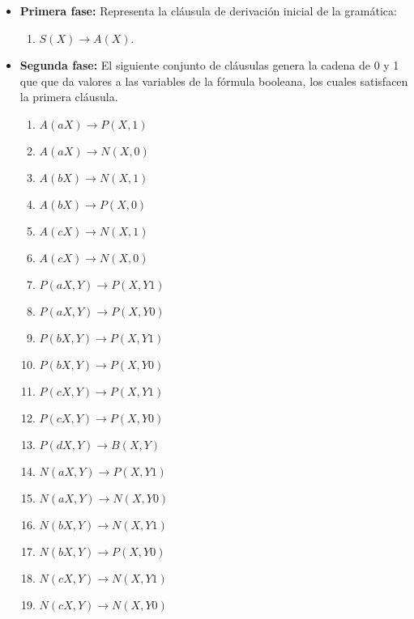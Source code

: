\begin{itemize}
    \item \textbf{Primera fase:} Representa la cláusula de derivación inicial de la gramática:
          \begin{enumerate}
              \item $S(X)\to A(X)$.
          \end{enumerate}

    \item \textbf{Segunda fase:} El siguiente conjunto de cláusulas genera la cadena de 0 y 1 que que da
          valores a las variables de la fórmula booleana, los cuales satisfacen la primera cláusula.
          \begin{multicols}{2}
              \begin{enumerate}[start=2]
                  \item $A(aX)\to P(X,1)$
                  \item $A(aX)\to N(X,0)$
                  \item $A(bX)\to N(X,1)$
                  \item $A(bX)\to P(X,0)$
                  \item $A(cX)\to N(X,1)$
                  \item $A(cX)\to N(X,0)$

                  \item $P(aX,Y)\to P(X,Y1)$
                  \item $P(aX,Y)\to P(X,Y0)$
                  \item $P(bX,Y)\to P(X,Y1)$
                  \item $P(bX,Y)\to P(X,Y0)$
                  \item $P(cX,Y)\to P(X,Y1)$
                  \item $P(cX,Y)\to P(X,Y0)$
                  \item $P(dX,Y)\to B(X,Y)$

                  \item $N(aX,Y)\to P(X,Y1)$
                  \item $N(aX,Y)\to N(X,Y0)$
                  \item $N(bX,Y)\to N(X,Y1)$
                  \item $N(bX,Y)\to P(X,Y0)$
                  \item $N(cX,Y)\to N(X,Y1)$
                  \item $N(cX,Y)\to N(X,Y0)$
              \end{enumerate}
          \end{multicols}


\end{itemize}
